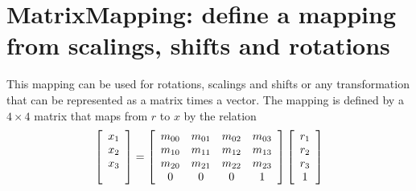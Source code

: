 \section{MatrixMapping: define a mapping from scalings, shifts and rotations} \label{sec:MatrixMapping}

This mapping can be used for rotations, scalings and shifts or any
transformation that can be represented as a matrix times a vector.
The mapping is defined by a $4\times4$ matrix 
that maps from $r$ to $x$ by the relation
$$
 \left[ \begin{array}{c} x_1 \\ x_2 \\ x_3 \\ \null \end{array} \right] 
  =
 \left[ \begin{array}{cccc}
      m_{00} & m_{01} & m_{02} & m_{03} \\
      m_{10} & m_{11} & m_{12} & m_{13} \\
      m_{20} & m_{21} & m_{22} & m_{23} \\
       0     &   0    &   0    &   1       
     \end{array} \right] 
 \left[ \begin{array}{c} r_1 \\ r_2 \\ r_3 \\ 1 \end{array} \right] 
$$


